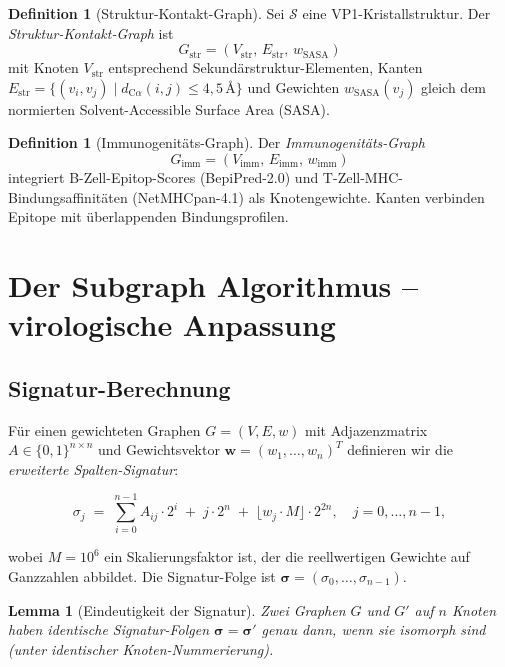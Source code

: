 ﻿\documentclass[a4paper,12pt]{article}
\theoremstyle{plain}
\newtheorem{lemma}[satz]{Lemma}
\theoremstyle{definition}
\newtheorem{definition}[satz]{Definition}
\theoremstyle{remark}
\begin{document}
\begin{definition}[Struktur-Kontakt-Graph]
Sei $\mathcal{S}$ eine VP1-Kristallstruktur. Der \emph{Struktur-Kontakt-Graph} ist
\[
  G_{\text{str}} = (V_{\text{str}},\, E_{\text{str}},\, w_{\text{SASA}})
\]
mit Knoten $V_{\text{str}}$ entsprechend Sekundärstruktur-Elementen,
Kanten $E_{\text{str}} = \{(v_i,v_j) \mid d_{\text{C}\alpha}(i,j) \leq 4{,}5\,\text{\AA}\}$
und Gewichten $w_{\text{SASA}}(v_j)$ gleich dem normierten Solvent-Accessible Surface Area (SASA).
\end{definition}

\begin{definition}[Immunogenitäts-Graph]
Der \emph{Immunogenitäts-Graph}
\[
  G_{\text{imm}} = (V_{\text{imm}},\, E_{\text{imm}},\, w_{\text{imm}})
\]
integriert B-Zell-Epitop-Scores (BepiPred-2.0) und T-Zell-MHC-Bindungsaffinitäten
(NetMHCpan-4.1) als Knotengewichte. Kanten verbinden Epitope mit überlappenden
Bindungsprofilen.
\end{definition}

\section{Der Subgraph Algorithmus -- virologische Anpassung}

\subsection{Signatur-Berechnung}

Für einen gewichteten Graphen $G=(V,E,w)$ mit Adjazenzmatrix $A\in\{0,1\}^{n\times n}$
und Gewichtsvektor $\mathbf{w}=(w_1,\ldots,w_n)^T$ definieren wir die
\emph{erweiterte Spalten-Signatur}:

\begin{equation}\label{eq:sigma}
  \sigma_j \;=\; \sum_{i=0}^{n-1} A_{ij}\cdot 2^i
             \;+\; j\cdot 2^n
             \;+\; \lfloor w_j \cdot M \rfloor \cdot 2^{2n},
             \quad j=0,\ldots,n-1,
\end{equation}

wobei $M=10^6$ ein Skalierungsfaktor ist, der die reellwertigen Gewichte auf
Ganzzahlen abbildet. Die Signatur-Folge ist $\boldsymbol{\sigma}=(\sigma_0,\ldots,\sigma_{n-1})$.

\begin{lemma}[Eindeutigkeit der Signatur]\label{lem:unique}
Zwei Graphen $G$ und $G'$ auf $n$ Knoten haben identische Signatur-Folgen
$\boldsymbol{\sigma}=\boldsymbol{\sigma}'$ genau dann, wenn sie isomorph sind
(unter identischer Knoten-Nummerierung).
\end{lemma}
\end{document}
